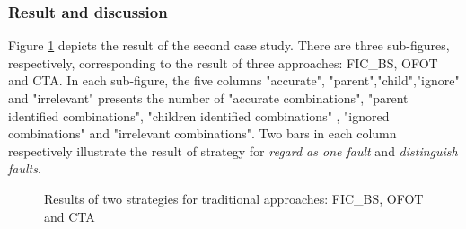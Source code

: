 \documentclass{sig-alternate}
\begin{document}
\subsubsection{Result and discussion}
Figure \ref{fig:normalexperiment} depicts the result of the second case study. There are three sub-figures, respectively, corresponding to the result of three approaches: FIC\_BS, OFOT and CTA. In each sub-figure, the five columns "accurate", "parent","child","ignore" and "irrelevant" presents the number of "accurate combinations", "parent identified combinations", "children identified combinations" , "ignored combinations" and "irrelevant combinations". Two bars in each column respectively illustrate the result of strategy for \emph{regard as one fault} and \emph{distinguish faults}.

\begin{figure}[ht]
\centering
{}
\caption[]{Results of two strategies for traditional approaches: FIC\_BS, OFOT and CTA}
\label{fig:normalexperiment}
\end{figure}
\end{document}
